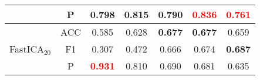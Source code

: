 \documentclass{acm_proc_article-sp}
\begin{document}
\begin{table}[!ht]
{\begin{tabular}{@{}c@{\hskip 0mm}c|ccccc@{}}
                                   &P    &0.798                              &0.815                             &0.790                             &\textcolor{red}{\textbf{0.836}}   &\textcolor{red}{0.761}\\ \midrule
\multirow{3}{*}{FastICA$_{20}$}    &ACC  &0.585                              &0.628                             &\textbf{0.677}                    &\textbf{0.677}                    &0.659\\
                                   &F1   &0.307                              &0.472                             &0.666                             &0.674                             &\textbf{0.687}\\
                                   &P    &\textcolor{red}{\textbf{0.931}}    &0.810                             &0.690                             &0.681                             &0.635\\ \bottomrule
\end{tabular}
}
\label{JHSY}
\end{table}
\end{document}
